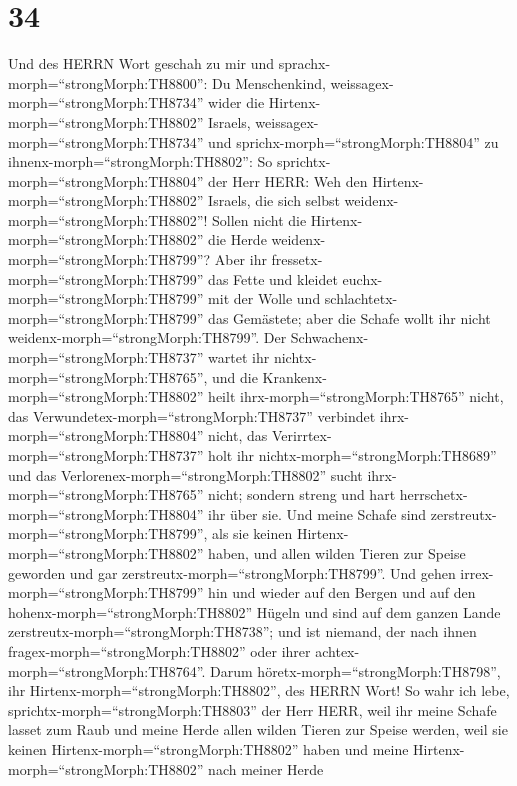 \hypertarget{section-33}{%
\section{34}\label{section-33}}

 Und des HERRN Wort geschah zu mir und
sprachx-morph=``strongMorph:TH8800'':  Du Menschenkind,
weissagex-morph=``strongMorph:TH8734'' wider die
Hirtenx-morph=``strongMorph:TH8802'' Israels,
weissagex-morph=``strongMorph:TH8734'' und
sprichx-morph=``strongMorph:TH8804'' zu
ihnenx-morph=``strongMorph:TH8802'': So
sprichtx-morph=``strongMorph:TH8804'' der Herr HERR: Weh den
Hirtenx-morph=``strongMorph:TH8802'' Israels, die sich selbst
weidenx-morph=``strongMorph:TH8802''! Sollen nicht die
Hirtenx-morph=``strongMorph:TH8802'' die Herde
weidenx-morph=``strongMorph:TH8799''?  Aber ihr
fressetx-morph=``strongMorph:TH8799'' das Fette und kleidet
euchx-morph=``strongMorph:TH8799'' mit der Wolle und
schlachtetx-morph=``strongMorph:TH8799'' das Gemästete; aber die Schafe
wollt ihr nicht weidenx-morph=``strongMorph:TH8799''.  Der
Schwachenx-morph=``strongMorph:TH8737'' wartet ihr
nichtx-morph=``strongMorph:TH8765'', und die
Krankenx-morph=``strongMorph:TH8802'' heilt
ihrx-morph=``strongMorph:TH8765'' nicht, das
Verwundetex-morph=``strongMorph:TH8737'' verbindet
ihrx-morph=``strongMorph:TH8804'' nicht, das
Verirrtex-morph=``strongMorph:TH8737'' holt ihr
nichtx-morph=``strongMorph:TH8689'' und das
Verlorenex-morph=``strongMorph:TH8802'' sucht
ihrx-morph=``strongMorph:TH8765'' nicht; sondern streng und hart
herrschetx-morph=``strongMorph:TH8804'' ihr über sie.  Und
meine Schafe sind zerstreutx-morph=``strongMorph:TH8799'', als sie
keinen Hirtenx-morph=``strongMorph:TH8802'' haben, und allen wilden
Tieren zur Speise geworden und gar
zerstreutx-morph=``strongMorph:TH8799''.  Und gehen
irrex-morph=``strongMorph:TH8799'' hin und wieder auf den Bergen und auf
den hohenx-morph=``strongMorph:TH8802'' Hügeln und sind auf dem ganzen
Lande zerstreutx-morph=``strongMorph:TH8738''; und ist niemand, der nach
ihnen fragex-morph=``strongMorph:TH8802'' oder ihrer
achtex-morph=``strongMorph:TH8764''.  Darum
höretx-morph=``strongMorph:TH8798'', ihr
Hirtenx-morph=``strongMorph:TH8802'', des HERRN Wort!  So
wahr ich lebe, sprichtx-morph=``strongMorph:TH8803'' der Herr HERR, weil
ihr meine Schafe lasset zum Raub und meine Herde allen wilden Tieren zur
Speise werden, weil sie keinen Hirtenx-morph=``strongMorph:TH8802''
haben und meine Hirtenx-morph=``strongMorph:TH8802'' nach meiner Herde
